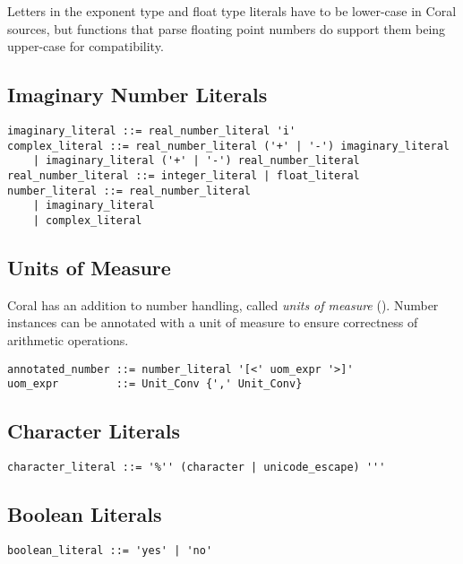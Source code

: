 Letters in the exponent type and float type literals have to be lower-case in Coral sources, but functions that parse floating point numbers do support them being upper-case for compatibility. 

\subsection{Imaginary Number Literals}\label{sec:imaginaryliterals}

\syntax\begin{lstlisting}
imaginary_literal ::= real_number_literal 'i'
complex_literal ::= real_number_literal ('+' | '-') imaginary_literal
	| imaginary_literal ('+' | '-') real_number_literal
real_number_literal ::= integer_literal | float_literal
number_literal ::= real_number_literal
	| imaginary_literal
	| complex_literal
\end{lstlisting}

\subsection{Units of Measure}
\label{sec:unitsofmeasuresyntax}

Coral has an addition to number handling, called {\em units of measure} (). Number instances can be annotated with a unit of measure to ensure correctness of arithmetic operations. 

\syntax\begin{lstlisting}
annotated_number ::= number_literal '[<' uom_expr '>]'
uom_expr         ::= Unit_Conv {',' Unit_Conv}
\end{lstlisting}

\subsection{Character Literals}\label{sec:characterliterals}

\syntax\begin{lstlisting}
character_literal ::= '%'' (character | unicode_escape) '''
\end{lstlisting}

\subsection{Boolean Literals}\label{sec:booleanliterals}

\syntax\begin{lstlisting}
boolean_literal ::= 'yes' | 'no'
\end{lstlisting}

